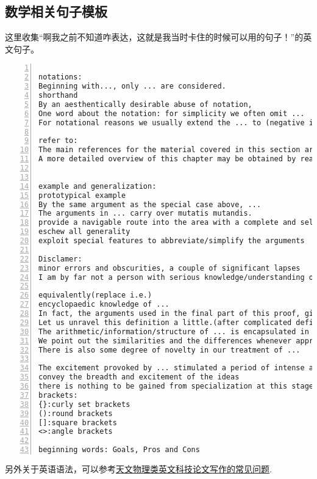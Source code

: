 \documentclass[11pt]{amsart}
\begin{document}
\subsection{数学相关句子模板}
这里收集“啊我之前不知道咋表达，这就是我当时卡住的时候可以用的句子！”的英文句子。
\begin{lstlisting}[numbers=left,numberstyle=\tiny,numbersep=10pt]

notations:
Beginning with..., only ... are considered.
shorthand
By an aesthentically desirable abuse of notation, 
One word about the notation: for simplicity we often omit ...
For notational reasons we usually extend the ... to (negative indices) by defining ...

refer to:
The main references for the material covered in this section are ...
A more detailed overview of this chapter may be obtained by reading the introductions to the various sections.


example and generalization:
prototypical example
By the same argument as the special case above, ...
The arguments in ... carry over mutatis mutandis.
provide a navigable route into the area with a complete and self-contained account of the case ...
eschew all generality
exploit special features to abbreviate/simplify the arguments

Disclamer:
minor errors and obscurities, a couple of significant lapses
I am by far not a person with serious knowledge/understanding of ..., thus in the ... I may oversimplify/overcomplicate things, be inaccurate, or even wrong, and miss subtelties.

equivalently(replace i.e.)
encyclopaedic knowledge of ...
In fact, the arguments used in the final part of this proof, give the following result.
Let us unravel this definition a little.(after complicated definition)
The arithmetic/information/structure of ... is encapsulated in ...
We point out the similarities and the differences whenever appropriate.
There is also some degree of novelty in our treatment of ...

The excitement provoked by ... stimulated a period of intense and widespread activity.
convey the breadth and excitement of the ideas
there is nothing to be gained from specialization at this stage
brackets:
{}:curly set brackets
():round brackets
[]:square brackets
<>:angle brackets

beginning words: Goals, Pros and Cons
\end{lstlisting}

另外关于英语语法，可以参考\href{https://arxiv.org/ftp/arxiv/papers/1011/1011.5973.pdf}{天文物理类英文科技论文写作的常见问题}.
\end{document}
